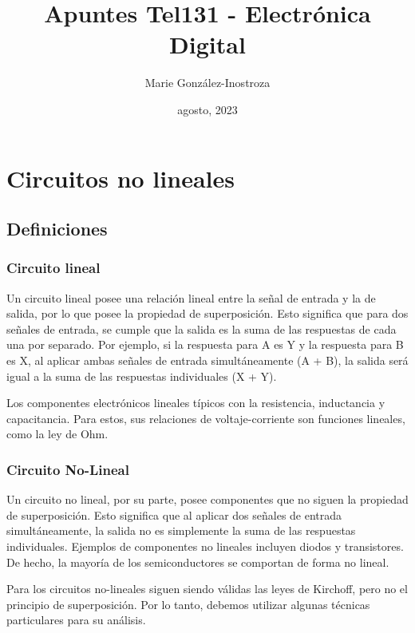 \documentclass[11pt,fancy,lang=es]{elegantbook}
\title{Apuntes Tel131 - Electrónica Digital}
\subtitle{Marie González-Inostroza}
\date{agosto, 2023}
\institute{Universidad Técnica Federico Santa María}
\begin{document}
\maketitle

\frontmatter
\tableofcontents

\mainmatter


%
%

%




\chapter{Circuitos no lineales}

\section{Definiciones}

\subsection{Circuito lineal}
Un circuito lineal posee una relación lineal entre la señal de entrada y la de salida, por lo que posee la propiedad de superposición. Esto significa que para dos señales de entrada, se cumple que la salida es la suma de las respuestas de cada una por separado. Por ejemplo, si la respuesta para A es Y y la respuesta para B es X, al aplicar ambas señales de entrada simultáneamente (A + B), la salida será igual a la suma de las respuestas individuales (X + Y). 

Los componentes electrónicos lineales típicos con la resistencia, inductancia y capacitancia. Para estos, sus relaciones de voltaje-corriente son funciones lineales, como la ley de Ohm.

\subsection{Circuito No-Lineal}
Un circuito no lineal, por su parte, posee componentes que no siguen la propiedad de superposición. Esto significa que al aplicar dos señales de entrada simultáneamente, la salida no es simplemente la suma de las respuestas individuales. Ejemplos de componentes no lineales incluyen diodos y transistores. De hecho, la mayoría de los semiconductores se comportan de forma no lineal.

Para los circuitos no-lineales siguen siendo válidas las leyes de Kirchoff, pero no el principio de superposición. Por lo tanto, debemos utilizar algunas técnicas particulares para su análisis.
\end{document}
